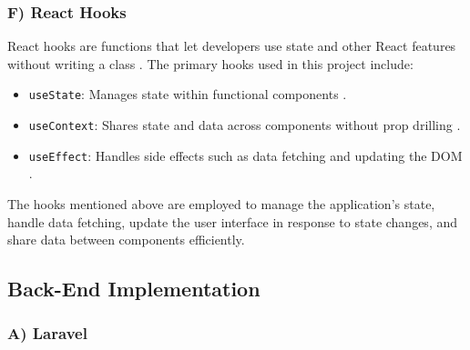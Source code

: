 \subsubsection*{F) React Hooks}

React hooks are functions that let developers use state and other React features without writing a class \cite{react-hooks-intro} \cite{react-hooks-reference}. The primary hooks used in this project include:

\begin{itemize}
    \item \texttt{useState}: Manages state within functional components \cite{react-hooks-state}.
    \item \texttt{useContext}: Shares state and data across components without prop drilling \cite{react-usecontext}.
    \item \texttt{useEffect}: Handles side effects such as data fetching and updating the DOM \cite{react-hooks-effect}.

\end{itemize}

The hooks mentioned above are employed to manage the application's state, handle data fetching, update the user interface in response to state changes, and share data between components efficiently.


\subsection{Back-End Implementation}
\subsubsection*{A) Laravel}

